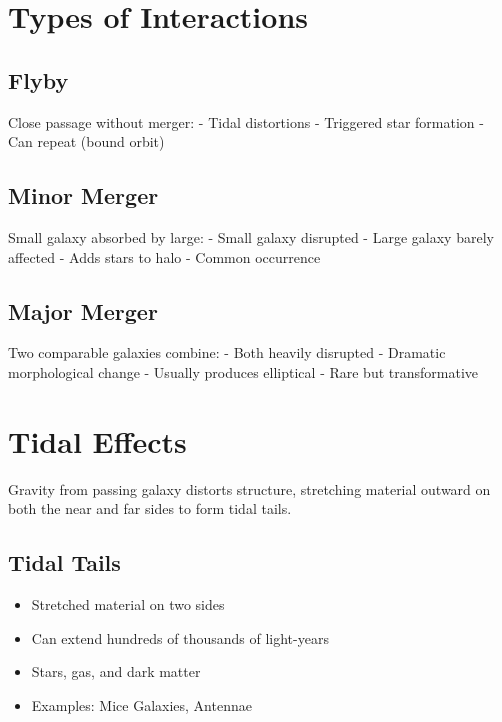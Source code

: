 \documentclass[
  11pt,
  letterpaper,
  twoside,
  openright]{book}
\providecommand{\tightlist}{%
  \setlength{\itemsep}{0pt}\setlength{\parskip}{0pt}}
\begin{document}
\section{Types of Interactions}\label{types-of-interactions}

\subsection{Flyby}\label{flyby}

Close passage without merger: - Tidal distortions - Triggered star
formation - Can repeat (bound orbit)

\subsection{Minor Merger}\label{minor-merger}

Small galaxy absorbed by large: - Small galaxy disrupted - Large galaxy
barely affected - Adds stars to halo - Common occurrence

\subsection{Major Merger}\label{major-merger}

Two comparable galaxies combine: - Both heavily disrupted - Dramatic
morphological change - Usually produces elliptical - Rare but
transformative

\section{Tidal Effects}\label{tidal-effects}

Gravity from passing galaxy distorts structure, stretching material
outward on both the near and far sides to form tidal tails.

\subsection{Tidal Tails}\label{tidal-tails}

\begin{itemize}
\tightlist
\item
  Stretched material on two sides
\item
  Can extend hundreds of thousands of light-years
\item
  Stars, gas, and dark matter
\item
  Examples: Mice Galaxies, Antennae
\end{itemize}
\end{document}
